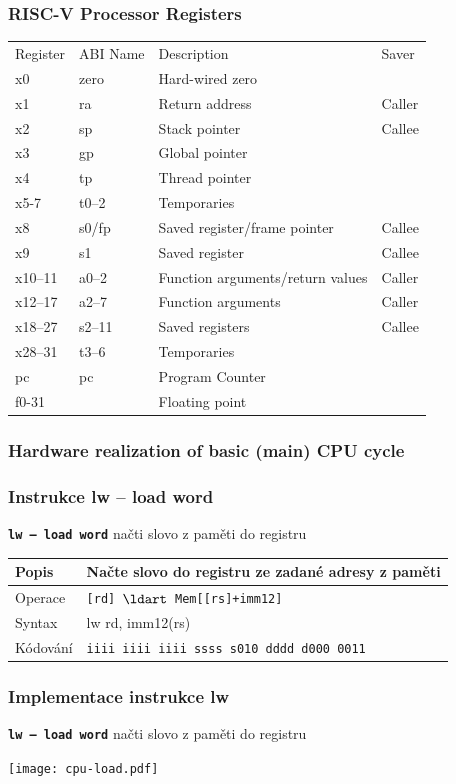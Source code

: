 \documentclass{beamer}
\begin{document}
\begin{frame}
\frametitle{RISC-V Processor Registers}
\begin{tabular}{l l l l}
Register & ABI Name & Description & Saver \\
x0 & zero & Hard-wired zero &  \\
x1 & ra & Return address & Caller \\
x2 & sp & Stack pointer &  Callee\\
x3 & gp & Global pointer &  \\
x4 & tp & Thread pointer &  \\
x5-7 & t0--2 & Temporaries &  \\
x8 & s0/fp & Saved register/frame pointer & Callee \\
x9 & s1 & Saved register &  Callee \\
x10--11 & a0--2 & Function arguments/return values &  Caller \\
x12--17 & a2--7 & Function arguments & Caller \\
x18--27 & s2--11 & Saved registers & Callee \\
x28--31 & t3--6 & Temporaries &  \\
pc & pc & Program Counter &  \\
f0-31 &  & Floating point &  \\
\end{tabular}
\end{frame}



\begin{frame}
\frametitle{Hardware realization of basic (main) CPU cycle}

\end{frame}



\begin{frame}
\frametitle{Instrukce lw -- load word}

\textbf{\texttt{lw -- load word}} načti slovo z paměti do registru

\begin{tabular}{|l|l|}\hline
Popis & Načte slovo do registru ze zadané adresy z paměti \\ \hline
Operace & \texttt{[rd] $\ldart$ Mem[[rs]+imm12]} \\ \hline
Syntax & lw rd, imm12(rs) \\ \hline
Kódování & \texttt{iiii iiii iiii ssss s010 dddd d000 0011} \\ \hline
\end{tabular}

\end{frame}

\begin{frame}
\frametitle{Implementace instrukce lw}

\textbf{\texttt{lw -- load word}} načti slovo z paměti do registru

\begin{center}
\texttt{[image: cpu-load.pdf]}
\end{center}


\end{frame}
\end{document}
